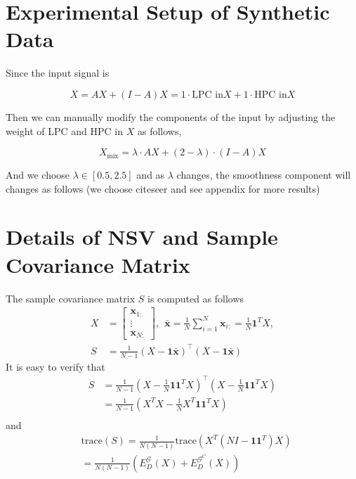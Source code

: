 \documentclass{article}
\newcommand{\trace}{\mathrm{trace}}
\newcommand{\0}{{\boldsymbol{0}}}
\newcommand{\6}{{\partial}}
\newcommand{\8}{{\infty}}
\newcommand{\4}{{\nabla}}
\begin{document}
\section{Experimental Setup of Synthetic Data}
\label{appendix:synthetic_setup}
Since the input signal is 

\begin{equation*}
    {X} =  A{X} +  (I-A) {X} = 1 \cdot \text{LPC in} {X} + 1 \cdot \text{HPC in} {X}
\end{equation*}

Then we can manually modify the components of the input by adjusting the weight of LPC and HPC in ${X}$ as follows,

\begin{equation*}
    {X}_{\text{mix}} =  \lambda \cdot A{X} + (2-\lambda) \cdot (I-A) {X} 
\end{equation*}

And we choose $\lambda \in [0.5,2.5]$ and as $\lambda$ changes, the smoothness component will changes as follows (we choose citeseer and see appendix for more results)

\section{Details of NSV and Sample Covariance Matrix}
\label{appendix:nsv_and_covariance_matrix}

The sample covariance matrix $S$ is computed as follows 
\begin{equation}
\begin{aligned}
{X} & =\left[\begin{array}{c}\bm{x}_{1:} \\ \vdots \\ \bm{x}_{N:} \end{array}\right], \ \ \bar{\bm{x}} = \frac{1}{N} \sum_{i=1}^{N} \bm{x}_{i:} = \frac{1}{N} \bm{1}^T {X}, \\ 
S & = \frac{1}{N-1} \left({X}-\bm{1} \bar{\bm{x}} \right)^{\top} \left({X}-\bm{1} \bar{\bm{x}} \right)
\end{aligned}
\end{equation}
It is easy to verify that
\begin{equation}
\begin{aligned}
S &= \frac{1}{N-1} \left({X}-\frac{1}{N} \bm{1}\bm{1}^T {X} \right)^{\top} \left({X}- \frac{1}{N} \bm{1} \bm{1}^T {X} \right) \\
& = \frac{1}{N-1} \left({X}^T {X} - \frac{1}{N} {X}^T \bm{1} \bm{1}^T {X} \right)\\
\end{aligned}
\end{equation}
and
\begin{equation}
    \begin{aligned}
    & \text{trace}(S) = \frac{1}{N(N-1)} \trace\left({X}^T (NI - \bm{1}\bm{1}^T ) {X}\right) \\
& = \frac{1}{N(N-1)} \left(E_D^\mathcal{G}({X}) + E_D^{\mathcal{G}^C}({X})\right)
    \end{aligned}
\end{equation}
\end{document}
